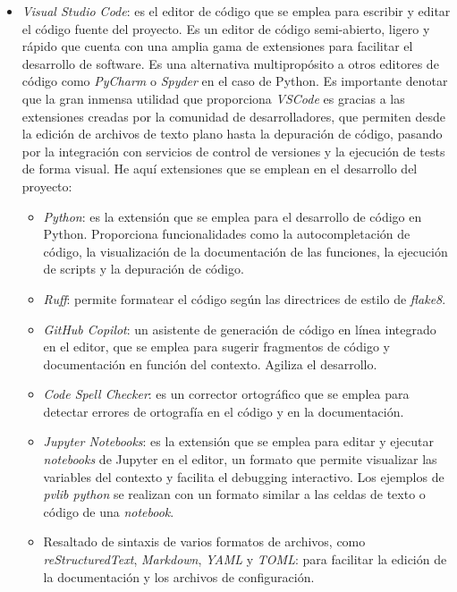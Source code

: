 \begin{itemize}
    \item \textit{Visual Studio Code}: es el editor de código que se emplea para escribir y editar el código fuente del proyecto. Es un editor de código semi-abierto, ligero y rápido que cuenta con una amplia gama de extensiones para facilitar el desarrollo de software. Es una alternativa multipropósito a otros editores de código como \textit{PyCharm} o \textit{Spyder} en el caso de Python. Es importante denotar que la gran inmensa utilidad que proporciona \textit{VSCode} es gracias a las extensiones creadas por la comunidad de desarrolladores, que permiten desde la edición de archivos de texto plano hasta la depuración de código, pasando por la integración con servicios de control de versiones y la ejecución de tests de forma visual. He aquí extensiones que se emplean en el desarrollo del proyecto:
          \begin{itemize}
              \item \textit{Python}: es la extensión que se emplea para el desarrollo de código en Python. Proporciona funcionalidades como la autocompletación de código, la visualización de la documentación de las funciones, la ejecución de scripts y la depuración de código.
              \item \textit{Ruff}: permite formatear el código según las directrices de estilo de \textit{flake8}.
              \item \textit{GitHub Copilot}: un asistente de generación de código en línea integrado en el editor, que se emplea para sugerir fragmentos de código y documentación en función del contexto. Agiliza el desarrollo.
              \item \textit{Code Spell Checker}: es un corrector ortográfico que se emplea para detectar errores de ortografía en el código y en la documentación.
              \item \textit{Jupyter Notebooks}: es la extensión que se emplea para editar y ejecutar \textit{notebooks} de Jupyter en el editor, un formato que permite visualizar las variables del contexto y facilita el debugging interactivo. Los ejemplos de \textit{pvlib python} se realizan con un formato similar a las celdas de texto o código de una \textit{notebook}.
              \item Resaltado de sintaxis de varios formatos de archivos, como \textit{reStructuredText}, \textit{Markdown}, \textit{YAML} y \textit{TOML}: para facilitar la edición de la documentación y los archivos de configuración.


\end{itemize}
\end{itemize}
